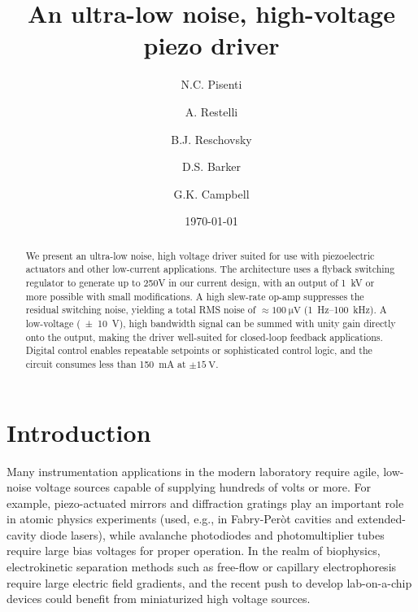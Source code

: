 \documentclass[aip,rsi,reprint]{revtex4-1} %
\begin{document}
\title{An ultra-low noise, high-voltage piezo driver}

\author{N.C. Pisenti}
\author{A. Restelli}
\author{B.J. Reschovsky}
\author{D.S. Barker}
\author{G.K. Campbell}

\date{\today}

\begin{abstract}
We present an ultra-low noise, high voltage driver suited for use with piezoelectric actuators and other low-current applications. 
The architecture uses a flyback switching regulator to generate up to 250V in our current design, with an output of \SI{1}{\kilo\volt} or more possible with small modifications. 
A high slew-rate op-amp suppresses the residual switching noise, yielding a total RMS noise of $\approx\SI{100}{\micro\volt}$ (\SI{1}{\hertz}--\SI{100}{\kilo\hertz}).
A low-voltage (\SI{\pm 10}{\volt}), high bandwidth signal can be summed with unity gain directly onto the output, making the driver well-suited for closed-loop feedback applications.
Digital control enables repeatable setpoints or sophisticated control logic, and the circuit consumes less than \SI{150}{\milli\ampere} at $\pm\SI{15}{\volt}$.
\end{abstract}

\pacs{}%

\maketitle %

\section{Introduction}
\label{Sec:Introduction}

Many instrumentation applications in the modern laboratory require agile, low-noise voltage sources capable of supplying hundreds of volts or more.
For example, piezo-actuated mirrors and diffraction gratings play an important role in atomic physics experiments (used, e.g., in Fabry-Per{\`o}t cavities\cite{Riedle1994a,Bohlouli-Zanjani2006a} and extended-cavity diode lasers\cite{Wieman1991a}), while avalanche photodiodes and photomultiplier tubes require large bias voltages for proper operation.
In the realm of biophysics, electrokinetic separation methods such as free-flow or capillary electrophoresis\cite{Kohlheyer2008a} require large electric field gradients, and the recent push to develop lab-on-a-chip devices could benefit from miniaturized high voltage sources\cite{Temiz2015a}.
\end{document}
